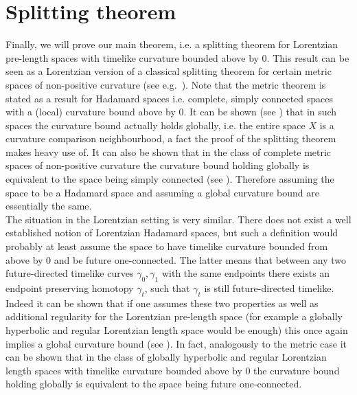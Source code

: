\documentclass[11pt,reqno]{amsart}
\theoremstyle{definition}
\theoremstyle{definition}
\theoremstyle{plain}
\theoremstyle{remark}
\begin{document}
\section{Splitting theorem}
Finally, we will prove our main theorem, i.e. a splitting theorem for Lorentzian pre-length spaces with timelike curvature bounded above by $0$. This result can be seen as a Lorentzian version of a classical splitting theorem for certain metric spaces of non-positive curvature (see e.g.\ \cite[Theorem 9.2.31.]{burago-burago-ivanov2001}). Note that the metric theorem is stated as a result for Hadamard spaces i.e. complete, simply connected spaces with a (local) curvature bound above by $0$. It can be shown (see \cite[Theorem 9.2.9]{burago-burago-ivanov2001}) that in such spaces the curvature bound actually holds globally, i.e. the entire space $X$ is a curvature comparison neighbourhood, a fact the proof of the splitting theorem makes heavy use of. It can also be shown that in the class of complete metric spaces of non-positive curvature the curvature bound holding globally is equivalent to the space being simply connected (see \cite[Remark 9.2.11.]{burago-burago-ivanov2001}). Therefore assuming the space to be a Hadamard space and assuming a global curvature bound are essentially the same. \\

The situation in the Lorentzian setting is very similar. There does not exist a well established notion of Lorentzian Hadamard spaces, but such a definition would probably at least assume the space to have timelike curvature bounded from above by $0$ and be future one-connected. The latter means that between any two future-directed timelike curves $\gamma_0,\gamma_1$ with the same endpoints there exists an endpoint preserving homotopy $\gamma_t$, such that $\gamma_t$ is still future-directed timelike. Indeed it can be shown that if one assumes these two properties as well as additional regularity for the Lorentzian pre-length space (for example a globally hyperbolic and regular Lorentzian length space would be enough) this once again implies a global curvature bound (see \cite[Theorem 4.8]{erös-gieger2025}). In fact, analogously to the metric case it can be shown that in the class of globally hyperbolic and regular Lorentzian length spaces with timelike curvature bounded above by $0$ the curvature bound holding globally is equivalent to the space being future one-connected.
\end{document}
